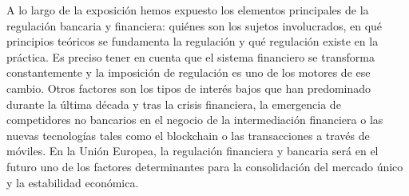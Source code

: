\documentclass{nuevotema}
\begin{document}
A lo largo de la exposición hemos expuesto los elementos principales de la regulación bancaria y financiera: quiénes son los sujetos involucrados, en qué principios teóricos se fundamenta la regulación y qué regulación existe en la práctica. Es preciso tener en cuenta que el sistema financiero se transforma constantemente y la imposición de regulación es uno de los motores de ese cambio. Otros factores son los tipos de interés bajos que han predominado durante la última década y tras la crisis financiera, la emergencia de competidores no bancarios en el negocio de la intermediación financiera o las nuevas tecnologías tales como el blockchain o las transacciones a través de móviles. En la Unión Europea, la regulación financiera y bancaria será en el futuro uno de los factores determinantes para la consolidación del mercado único y la estabilidad económica.



%
%
\end{document}
